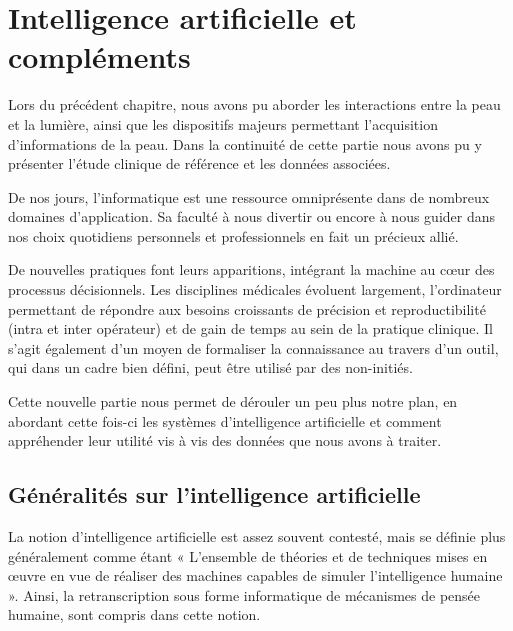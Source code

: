 \chapter{Intelligence artificielle et compléments}
\label{chap:chapter_3}
\chapterintro
Lors du précédent chapitre, nous avons pu aborder les interactions entre la peau et la lumière, ainsi que les dispositifs majeurs permettant l'acquisition d'informations de la peau. Dans la continuité de cette partie nous avons pu y présenter l'étude clinique de référence et les données associées.\par

De nos jours, l’informatique est une ressource omniprésente dans de nombreux domaines d’application. Sa faculté à nous divertir ou encore à nous guider dans nos choix quotidiens personnels et professionnels en fait un précieux allié.\par 

De nouvelles pratiques font leurs apparitions, intégrant la machine au cœur des processus décisionnels. Les disciplines médicales évoluent largement, l’ordinateur permettant de répondre aux besoins croissants de précision et reproductibilité (intra et inter opérateur) et de gain de temps au sein de la pratique clinique. Il s’agit également d’un moyen de formaliser la connaissance au travers d’un outil, qui dans un cadre bien défini, peut être utilisé par des non-initiés.\par

Cette nouvelle partie nous permet de dérouler un peu plus notre plan, en abordant cette fois-ci les systèmes d'intelligence artificielle et comment appréhender leur utilité vis à vis des données que nous avons à traiter.\par
\newpage

\section{Généralités sur l'intelligence artificielle}
La notion d’intelligence artificielle est assez souvent contesté, mais se définie plus généralement comme étant « L’ensemble de théories et de techniques mises en œuvre en vue de réaliser des machines capables de simuler l'intelligence humaine ». Ainsi, la retranscription sous forme informatique de mécanismes de pensée humaine, sont compris dans cette notion.\par


